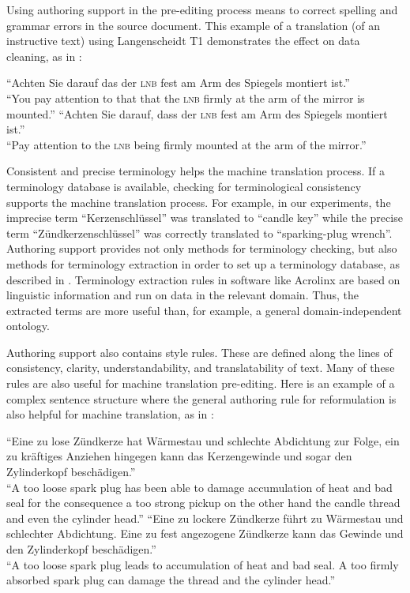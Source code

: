 \documentclass[output=paper]{LSP/langsci}
\begin{document}
Using authoring support in the pre-editing process means to correct spelling and grammar errors in the source document. This example of a translation (of an instructive text) using Langenscheidt T1 demonstrates the effect on data cleaning, as in :


\begin{exe}
\label{ex:siegel:2}
\ex
\begin{xlist}
\ex
``Achten Sie darauf das der \textsc{lnb} fest am Arm des Spiegels montiert ist.'' \\ ``You pay attention to that that the \textsc{lnb} firmly at the arm of the mirror is mounted.'' 
\ex
``Achten Sie darauf, dass der \textsc{lnb} fest am Arm des Spiegels montiert ist.'' \\ ``Pay attention to the \textsc{lnb} being firmly mounted at the arm of the mirror.''
\end{xlist}
\end{exe}

Consistent and precise terminology helps the machine translation process. If a terminology database is available, checking for terminological consistency supports the machine translation process. For example, in our experiments, the imprecise term ``Kerzenschlüssel'' was translated to ``candle key'' while the precise term ``Zündkerzenschlüssel'' was correctly translated to ``sparking-plug wrench''. Authoring support provides not only methods for terminology checking, but also methods for terminology extraction in order to set up a terminology database, as described in . Terminology extraction rules in software like Acrolinx are based on linguistic information and run on data in the relevant domain. Thus, the extracted terms are more useful than, for example, a general domain-independent ontology.

Authoring support also contains style rules. These are defined along the lines of consistency, clarity, understandability, and translatability of text. Many of these rules are also useful for machine translation pre-editing. Here is an example of a complex sentence structure where the general authoring rule for reformulation is also helpful for machine translation, as in :

\begin{exe}
\label{ex:siegel:3}
\ex
\begin{xlist} 
\ex ``Eine zu lose Zündkerze hat Wärmestau und schlechte Abdichtung zur Folge, ein zu kräftiges Anziehen hingegen kann das Kerzengewinde und sogar den Zylinderkopf beschädigen.'' \\ ``A too loose spark plug has been able to damage accumulation of heat and bad seal for the consequence a too strong pickup on the other hand the candle thread and even the cylinder head.''
\ex ``Eine zu lockere Zündkerze führt zu Wärmestau und schlechter Abdichtung. Eine zu fest angezogene Zündkerze  kann das Gewinde und den Zylinderkopf beschädigen.'' \\ ``A too loose spark plug leads to accumulation of heat and bad seal. A too firmly absorbed spark plug can damage the thread and the cylinder head.''
\end{xlist} 
\end{exe}
\end{document}
